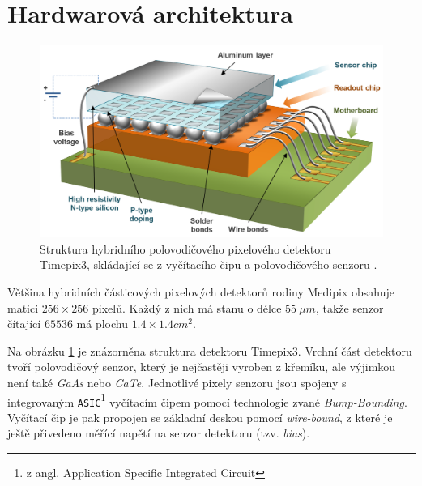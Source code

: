 \section{Hardwarová architektura}
\begin{figure}[th]
	\begin{center}
		\includegraphics[width=12cm]{figures/det_chip.png}
		\caption{Struktura hybridního polovodičového pixelového detektoru Timepix3, skládající se z vyčítacího čipu a polovodičového senzoru \cite{PlatkevicDisertace}.}
		\label{fig:det:chip}
	\end{center}
\end{figure}
Většina hybridních částicových pixelových detektorů rodiny Medipix obsahuje matici $256\times256$ pixelů. Každý z nich má stanu o délce $55~\mu m$, takže senzor čítající $65536$ má plochu $1.4 \times 1.4 cm^2$. 

Na obrázku \ref{fig:det:chip} je znázorněna struktura detektoru Timepix3. Vrchní část detektoru tvoří polovodičový senzor, který je nejčastěji vyroben z křemíku, ale výjimkou není také \textit{GaAs} nebo \textit{CaTe}. Jednotlivé pixely senzoru jsou spojeny s integrovaným \texttt{ASIC}\footnote{z angl. Application Specific Integrated Circuit} vyčítacím čipem pomocí technologie zvané \textit{Bump-Bounding}. Vyčítací čip je pak propojen se základní deskou pomocí \textit{wire-bound}, z které je ještě přivedeno měřící napětí na senzor detektoru (tzv. \textit{bias}).



